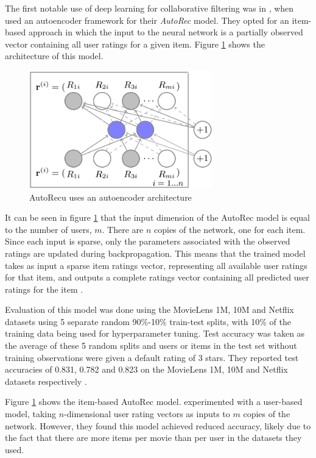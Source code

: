 The first notable use of deep learning for collaborative filtering was in \cite*{sedhain2015autorec}, when \citeauthor{sedhain2015autorec} used an autoencoder framework for their \textit{AutoRec} model. They opted for an item-based approach in which the input to the neural network is a partially observed vector containing all user ratings for a given item. Figure \ref{fig:autorec-arch} shows the architecture of this model.

\begin{figure}[H]
\centering
\includegraphics[width=8cm]{Figures/2_autoRec.png}
\decoRule
\caption[AutoRec]{AutoRecu uses an autoencoder architecture  \parencite{sedhain2015autorec}}
\label{fig:autorec-arch}
\end{figure}

It can be seen in figure \ref{fig:autorec-arch} that the input dimension of the AutoRec model is equal to the number of users, $m$. There are $n$ copies of the network, one for each item. Since each input is sparse, only the parameters associated with the observed ratings are updated during backpropagation. This means that the trained model takes as input a sparse item ratings vector, representing all available user ratings for that item, and outputs a complete ratings vector containing all predicted user ratings for the item \parencite{sedhain2015autorec}.

Evaluation of this model was done using the MovieLens 1M, 10M and Netflix datasets using 5 separate random 90\%-10\% train-test splits, with 10\% of the training data being used for hyperparameter tuning. Test accuracy was taken as the average of these 5 random splits and users or items in the test set without training observations were given a default rating of 3 stars. They reported test accuracies of 0.831, 0.782 and 0.823 on the MovieLens 1M, 10M and Netflix datasets respectively \parencite{sedhain2015autorec}.

Figure \ref{fig:autorec-arch} shows the item-based AutoRec model.
\citeauthor{sedhain2015autorec} experimented with a user-based model, taking $n$-dimensional user rating vectors as inputs to $m$ copies of the network. However, they found this model achieved reduced accuracy, likely due to the fact that there are more items per movie than per user in the datasets they used.

